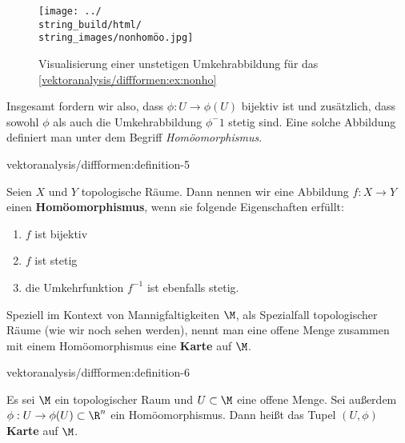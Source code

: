 \documentclass[letterpaper,10pt,english]{jupyterBook}
\begin{document}
\begin{figure}[htbp]
\centering


\noindent\texttt{[image: ../\\string\_build/html/\\string\_images/nonhomöo.jpg]}
\caption{Visualisierung einer unstetigen Umkehrabbildung für das \cref{vektoranalysis/diffformen:ex:nonho} }\label{\detokenize{vektoranalysis/diffformen:fig-nonh}}\end{figure}

\par
Insgesamt fordern wir also, dass \(\phi:U\rightarrow\phi(U)\) bijektiv ist und zusätzlich, dass sowohl \(\phi\) als auch die Umkehrabbildung \(\phi^-1\) stetig sind.
Eine solche Abbildung definiert man unter dem Begriff \emph{Homöomorphismus}.
\begin{definition}{}{vektoranalysis/diffformen:definition-5}



\par
Seien \(X\) und \(Y\) topologische Räume.
Dann nennen wir eine Abbildung \(f \colon X \rightarrow Y\) einen \textbf{Homöomorphismus}, wenn sie folgende Eigenschaften erfüllt:
\begin{enumerate}

\item {} 
\par
\(f\) ist bijektiv

\item {} 
\par
\(f\) ist stetig

\item {} 
\par
die Umkehrfunktion \(f^{-1}\) ist ebenfalls stetig.

\end{enumerate}
\end{definition}

\par
Speziell im Kontext von Mannigfaltigkeiten \(\M\), als Spezialfall topologischer Räume (wie wir noch sehen werden), nennt man eine offene Menge zusammen mit einem Homöomorphismus eine \textbf{Karte} auf \(\M\).
\begin{definition}{}{vektoranalysis/diffformen:definition-6}



\par
Es sei \(\M\) ein topologischer Raum und \(U\subset\M\) eine offene Menge.
Sei außerdem \(\phi:U\rightarrow \phi(U)\subset \R^n\) ein Homöomorphismus.
Dann heißt das Tupel \((U,\phi)\) \textbf{Karte} auf \(\M\).
\end{definition}
\end{document}
